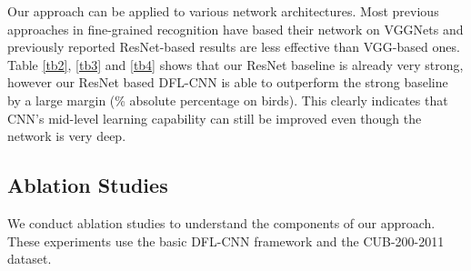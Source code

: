 \documentclass[10pt,twocolumn,letterpaper]{article}
\begin{document}
\begin{table}
\centering
{}
\vspace{1pt}
\caption{\label{tb4}Comparison of our approach (DFL-CNN) to recent results on
FGVC-Aircraft \textbf{without} extra annotation (if not specified).}
\vspace{-10pt}
\end{table}

Our approach can be applied to various network architectures.
Most previous approaches in fine-grained recognition have based their network on VGGNets and previously reported
ResNet-based results are less effective than VGG-based ones. Table \ref{tb2}, \ref{tb3} and \ref{tb4} shows that our
ResNet baseline is already very
strong, however our ResNet based DFL-CNN is able to outperform the strong baseline by a large margin (\% absolute
percentage on birds). This clearly indicates that CNN's mid-level learning capability can still be improved even
though the network is very deep.

\subsection{Ablation Studies} \label{sec4_5}
We conduct ablation studies to understand the components of our approach. These
experiments use the basic DFL-CNN framework and the CUB-200-2011 dataset.
\end{document}
